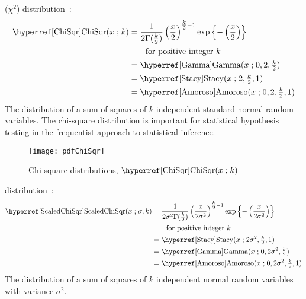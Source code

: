  ($\chi^2$)  distribution~\cite{Fisher1924,Johnson1994}:
\begin{align}
\label{ChiSqr}
\opr{ChiSqr}(x \given k) 
&= \frac{1}{2\Gamma(\tfrac{k}{2})} \left(\frac{x}{2}\right)^{\tfrac{k}{2}-1} 
\exp\left\{-\left(\frac{x}{2}\right)\right\} 	\checked
\\
& \qquad \text{for positive integer } k \notag \checked \\
&=  \opr{Gamma}(x\given  0, 2,\tfrac{k}{2}) \notag \checked \\
&=  \opr{Stacy}(x\given 2, \tfrac{k}{2},1) \notag \checked \\
&=  \opr{Amoroso}(x\given  0, 2, \tfrac{k}{2}, 1) \checked \notag 
\end{align}
The distribution of a sum of squares of $k$ independent standard normal random variables.  The chi-square distribution is important for statistical hypothesis testing in the frequentist approach to statistical inference.



\begin{figure}[t!]
\begin{center}
\texttt{[image: pdfChiSqr]}
\end{center}
\caption[Chi-square distributions]{Chi-square distributions, $\opr{ChiSqr}(x\given k)$}
\end{figure}



  distribution~\cite{Lee2012}:
\begin{align}
\label{ScaledChiSqr}
\opr{ScaledChiSqr}(x \given \sigma, k) 
&= \frac{1}{2\sigma^2\Gamma(\tfrac{k}{2})} \left(\frac{x}{2\sigma^2}\right)^{\tfrac{k}{2}-1} 
\exp\left\{-\left(\frac{x}{2\sigma^2} \right)\right\} \checked \\
& \qquad \text{for positive integer } k \notag \\
&=  \opr{Stacy}(x\given 2\sigma^2, \tfrac{k}{2},1)  \checked\notag \\
&=\opr{Gamma}(x\given 0, 2\sigma^2, \tfrac{k}{2}) \checked \notag \\
&=  \opr{Amoroso}(x\given  0, 2\sigma^2, \tfrac{k}{2}, 1) \checked \notag 
\end{align}
The distribution of a sum of squares of $k$ independent normal random variables with variance $\sigma^2$.



\label{GammaInterrelations}



